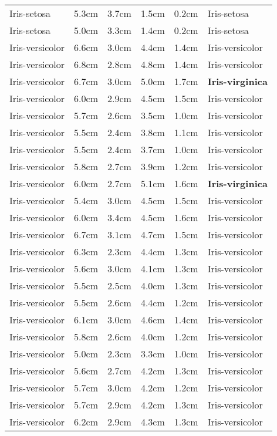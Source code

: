 \documentclass[a4paper, 12pt]{article}
\begin{document}
\begin{center}
\begin{longtable}{ l l l l l l }
Iris-setosa & 5.3cm & 3.7cm & 1.5cm & 0.2cm & Iris-setosa\\
Iris-setosa & 5.0cm & 3.3cm & 1.4cm & 0.2cm & Iris-setosa\\
Iris-versicolor & 6.6cm & 3.0cm & 4.4cm & 1.4cm & Iris-versicolor\\
Iris-versicolor & 6.8cm & 2.8cm & 4.8cm & 1.4cm & Iris-versicolor\\
Iris-versicolor & 6.7cm & 3.0cm & 5.0cm & 1.7cm & \textbf{Iris-virginica}\\
Iris-versicolor & 6.0cm & 2.9cm & 4.5cm & 1.5cm & Iris-versicolor\\
Iris-versicolor & 5.7cm & 2.6cm & 3.5cm & 1.0cm & Iris-versicolor\\
Iris-versicolor & 5.5cm & 2.4cm & 3.8cm & 1.1cm & Iris-versicolor\\
Iris-versicolor & 5.5cm & 2.4cm & 3.7cm & 1.0cm & Iris-versicolor\\
Iris-versicolor & 5.8cm & 2.7cm & 3.9cm & 1.2cm & Iris-versicolor\\
Iris-versicolor & 6.0cm & 2.7cm & 5.1cm & 1.6cm & \textbf{Iris-virginica}\\
Iris-versicolor & 5.4cm & 3.0cm & 4.5cm & 1.5cm & Iris-versicolor\\
Iris-versicolor & 6.0cm & 3.4cm & 4.5cm & 1.6cm & Iris-versicolor\\
Iris-versicolor & 6.7cm & 3.1cm & 4.7cm & 1.5cm & Iris-versicolor\\
Iris-versicolor & 6.3cm & 2.3cm & 4.4cm & 1.3cm & Iris-versicolor\\
Iris-versicolor & 5.6cm & 3.0cm & 4.1cm & 1.3cm & Iris-versicolor\\
Iris-versicolor & 5.5cm & 2.5cm & 4.0cm & 1.3cm & Iris-versicolor\\
Iris-versicolor & 5.5cm & 2.6cm & 4.4cm & 1.2cm & Iris-versicolor\\
Iris-versicolor & 6.1cm & 3.0cm & 4.6cm & 1.4cm & Iris-versicolor\\
Iris-versicolor & 5.8cm & 2.6cm & 4.0cm & 1.2cm & Iris-versicolor\\
Iris-versicolor & 5.0cm & 2.3cm & 3.3cm & 1.0cm & Iris-versicolor\\
Iris-versicolor & 5.6cm & 2.7cm & 4.2cm & 1.3cm & Iris-versicolor\\
Iris-versicolor & 5.7cm & 3.0cm & 4.2cm & 1.2cm & Iris-versicolor\\
Iris-versicolor & 5.7cm & 2.9cm & 4.2cm & 1.3cm & Iris-versicolor\\
Iris-versicolor & 6.2cm & 2.9cm & 4.3cm & 1.3cm & Iris-versicolor\\

\end{longtable}
\end{center}
\end{document}
